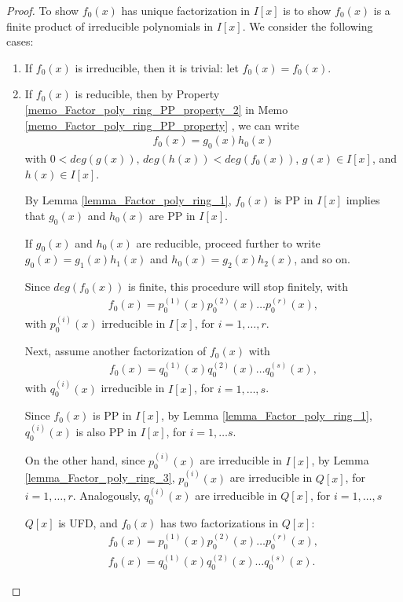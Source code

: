 \documentclass[utf8]{ctexbook}
\begin{document}
\begin{proof}
To show $f_0 (x)$ has unique factorization in $I[x]$ is to show $f_0 (x)$ is a finite product of irreducible polynomials in $I[x]$. We consider the following cases:
\begin{enumerate}
\item{If $f_0 (x)$ is irreducible, then it is trivial: let $f_0 (x) = f_0 (x)$.}
\item{If $f_0 (x)$ is reducible, then by Property \ref{memo_Factor_poly_ring_PP_property_2} in Memo \ref{memo_Factor_poly_ring_PP_property} , we can write
\begin{align*}
f_0 (x) = g_0 (x) h_0 (x)
\end{align*}
with $0 < deg(g(x)), \, deg(h(x)) < deg(f_0 (x))$, $g(x) \in I[x] $, and $h(x) \in I[x]$. 

By Lemma \ref{lemma_Factor_poly_ring_1}, $f_0 (x)$ is PP in $I[x]$ implies that $g_0 (x)$ and $h_0 (x)$ are PP in $I[x]$.

If $g_0 (x)$ and $h_0 (x)$ are reducible, proceed further to write $g_0 (x) = g_1 (x) h_1 (x)$ and $h_0 (x) = g_2 (x) h_2 (x)$, and so on.

Since $deg(f_0 (x))$ is finite, this procedure will stop finitely, with
\begin{align*}
f_0 (x) = p_0 ^{(1)} (x) p_0 ^{(2)} (x) \ldots p_0 ^{(r)} (x) ,
\end{align*}
with $p_0 ^{(i)} (x)$ irreducible in $I[x]$, for $i = 1, \ldots, r$.

Next, assume another factorization of $f_0 (x)$ with
\begin{align*}
f_0 (x) = q_0 ^{(1)} (x) q_0 ^{(2)} (x) \ldots q_0 ^{(s)} (x) ,
\end{align*}
with $q_0 ^{(i)} (x)$ irreducible in $I[x]$, for $i = 1, \ldots, s$. 

Since $f_0(x)$ is PP in $I[x]$, by Lemma \ref{lemma_Factor_poly_ring_1}, $q_0 ^{(i)} (x)$ is also PP in $I[x]$, for $i = 1, \ldots s$.

On the other hand, since $p_0 ^{(i)} (x)$ are irreducible in $I[x]$, by Lemma \ref{lemma_Factor_poly_ring_3}, $p_0 ^{(i)} (x)$ are irreducible in $Q[x]$, for $i = 1, \ldots, r$. Analogously, $q_0 ^{(i)} (x)$ are irreducible in $Q[x]$, for $i = 1, \ldots, s$

$Q[x]$ is UFD, and $f_0(x)$ has two factorizations in $Q[x]$:
\begin{align*}
f_0 (x) = p_0 ^{(1)} (x) p_0 ^{(2)} (x) \ldots p_0 ^{(r)} (x) , \\
f_0 (x) = q_0 ^{(1)} (x) q_0 ^{(2)} (x) \ldots q_0 ^{(s)} (x) .
\end{align*}

}
\end{enumerate}
\end{proof}
\end{document}
